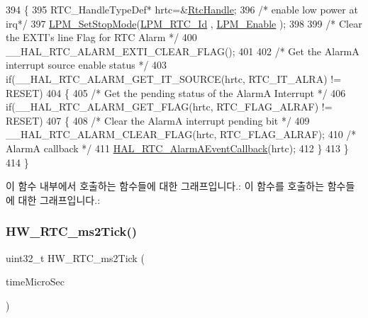 \begin{DoxyCode}
394 \{
395   RTC\_HandleTypeDef* hrtc=&\mbox{\hyperlink{hw__rtc_8c_af5a469a44a56337e00dc30b13e2bc051}{RtcHandle}};
396   \textcolor{comment}{/* enable low power at irq*/}
397   \mbox{\hyperlink{low__power__manager_8c_ac8a0ff787d7d417b9e1f0697a1d5fd6d}{LPM\_SetStopMode}}(\mbox{\hyperlink{utilities__conf_8h_acfda396432d3ff49786067a2271b5946aa8deb6dd6bf7825a5cd8fb7f727dc860}{LPM\_RTC\_Id}} , \mbox{\hyperlink{low__power__manager_8h_a271e41b451de2369d381b2976f39de57a6fdf7ef1f943192b3507c74647d6d46c}{LPM\_Enable}} );
398   
399   \textcolor{comment}{/* Clear the EXTI's line Flag for RTC Alarm */}
400   \_\_HAL\_RTC\_ALARM\_EXTI\_CLEAR\_FLAG();
401   
402     \textcolor{comment}{/* Get the AlarmA interrupt source enable status */}
403   \textcolor{keywordflow}{if}(\_\_HAL\_RTC\_ALARM\_GET\_IT\_SOURCE(hrtc, RTC\_IT\_ALRA) != RESET)
404   \{
405     \textcolor{comment}{/* Get the pending status of the AlarmA Interrupt */}
406     \textcolor{keywordflow}{if}(\_\_HAL\_RTC\_ALARM\_GET\_FLAG(hrtc, RTC\_FLAG\_ALRAF) != RESET)
407     \{
408       \textcolor{comment}{/* Clear the AlarmA interrupt pending bit */}
409       \_\_HAL\_RTC\_ALARM\_CLEAR\_FLAG(hrtc, RTC\_FLAG\_ALRAF); 
410       \textcolor{comment}{/* AlarmA callback */}
411       \mbox{\hyperlink{stm32l1xx__hal__msp_8c_a11aeff83fd498cddbed3bcddcf017e0a}{HAL\_RTC\_AlarmAEventCallback}}(hrtc);
412     \}
413   \}
414 \}
\end{DoxyCode}
이 함수 내부에서 호출하는 함수들에 대한 그래프입니다.\+:
이 함수를 호출하는 함수들에 대한 그래프입니다.\+:
\mbox{\label{group___lory_s_d_k___r_t_c___functions_gab105bfcf0c8b346a1b20b158b8f8a86e}} 
\subsubsection{\texorpdfstring{H\+W\+\_\+\+R\+T\+C\+\_\+ms2\+Tick()}{HW\_RTC\_ms2Tick()}}
{\footnotesize\ttfamily uint32\+\_\+t H\+W\+\_\+\+R\+T\+C\+\_\+ms2\+Tick (\begin{DoxyParamCaption}\item[{\mbox{\hyperlink{utilities_8h_a4215ca43d3e953099ea758ce428599d0}{Timer\+Time\+\_\+t}}}]{time\+Micro\+Sec }\end{DoxyParamCaption})}



